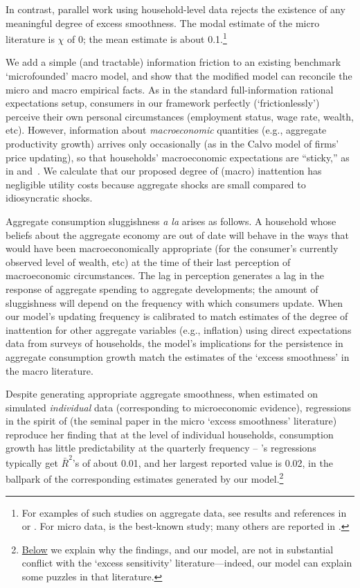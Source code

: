 \documentclass[titlepage]{./econtex}
\begin{document}
In contrast, parallel work using household-level data rejects the existence of any meaningful degree of excess smoothness.  The modal estimate of the micro literature is $\chi$ of 0; the mean estimate is about 0.1.\footnote{For examples of such studies on aggregate data, see results and references in \cite{fuhrer:habits} or \cite{cee:habits}. For micro data, \cite{dynanHabits} is the best-known study; many others are reported in \cite{hrsHabit}.}


We add a simple (and tractable) information friction to an existing benchmark `microfounded' macro model, and show that the modified model can reconcile the micro and macro empirical facts. As in the standard full-information rational expectations setup, consumers in our framework perfectly (`frictionlessly') perceive their own personal circumstances (employment status, wage rate, wealth, etc). However, information about \textit{macroeconomic} quantities (e.g., aggregate productivity growth) arrives only occasionally (as in the Calvo model of firms' price updating), so that households' macroeconomic expectations are ``sticky,'' as in \cite{mrSlumps} and~\cite{carroll:epidemicinflQJE}. We calculate that our proposed degree of (macro) inattention has negligible utility costs because aggregate shocks are small compared to idiosyncratic shocks.

Aggregate consumption sluggishness \textit{a la} \cite{cdSmooth} arises as follows.  A household whose beliefs about the aggregate economy are out of date will behave in the ways that would have been macroeconomically appropriate (for the consumer's currently observed level of wealth, etc) at the time of their last perception of macroeconomic circumstances.  The lag in perception generates a lag in the response of aggregate spending to aggregate developments; the amount of sluggishness will depend on the frequency with which consumers update.  When our model's updating frequency is calibrated to match estimates of the degree of inattention for other aggregate variables (e.g., inflation) using direct expectations data from surveys of households, the model's implications for the persistence in aggregate consumption growth match the estimates of the `excess smoothness' in the macro literature. 

Despite generating appropriate aggregate smoothness, when estimated on simulated \emph{individual} data (corresponding to microeconomic evidence), regressions in the spirit of  \cite{dynanHabits} (the seminal paper in the micro `excess smoothness' literature) reproduce her finding that at the level of individual households, consumption growth has little predictability at the quarterly frequency -- \cite{dynanHabits}'s regressions typically get $\bar{R}^{2}$'s of about 0.01, and her largest reported value is 0.02, in the ballpark of the corresponding estimates generated by our model.\footnote{\hyperlink{Excess-Sensitivity}{Below} we explain why the \cite{hrsHabit} findings, and our model, are not in substantial conflict with the `excess sensitivity' literature---indeed, our model can explain some puzzles in that literature.}
 
\end{document}
